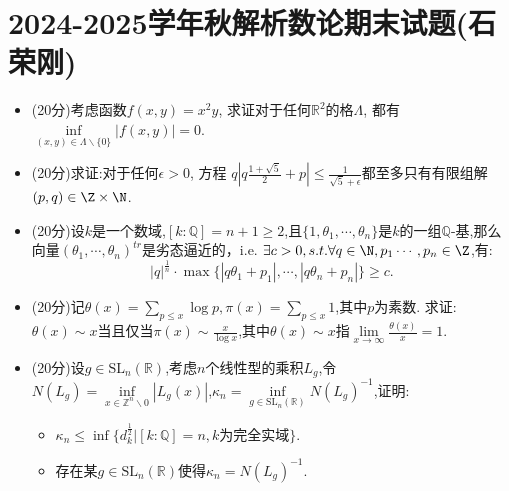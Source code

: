 
\section{2024-2025学年秋解析数论期末试题(石荣刚)}

\begin{itemize}
    \item[1.](20分)考虑函数$f(x,y) = x^2 y$, 求证对于任何$\mathbb{R}^2$的格$\Lambda$, 都有$\inf\limits_{(x,y) \in \Lambda \backslash \{0\}} |f(x,y)| = 0$.

    \item[2.](20分)求证:对于任何$\epsilon > 0$, 方程 $q|q \frac{1+\sqrt 5}{2} + p| \leq \frac{1}{\sqrt{5} + \epsilon}$都至多只有有限组解$(p,q) \in \Z \times \N$.

    \item[3.](20分)设$k$是一个数域,$[k:\mathbb{Q}] = n+1 \geq 2$,且$\{1,\theta_1, \cdots, \theta_n\}$是$k$的一组$\mathbb{Q}$-基,那么向量$(\theta_1, \cdots, \theta_n)^{tr}$是劣态逼近的，i.e. 
    $\exists c  > 0, s.t.  \forall q\in \N, p_1 \cdots, p_n \in \Z$,有:
    \[
    |q|^{\frac{1}{n}} \cdot \max \{ |q\theta_1 + p_1| , \cdots  , |q\theta_n+ p_n|\} \geq c.
    \]

    \item[4.](20分)记$\theta(x) = \sum\limits_{p \leq x} \log p,\pi(x) = \sum\limits_{p \leq x} 1$,其中$p$为素数. 求证: $\theta(x) \sim x $当且仅当$ \pi(x) \sim \frac{x}{\log x}$,其中$\theta(x) \sim x $指$\lim\limits_{x\rightarrow\infty}\frac{\theta(x)}{x}=1$.

    \item[5.](20分)设$g\in\text{SL}_{n}(\mathbb{R})$,考虑$n$个线性型的乘积$L_{g}$,令$N(L_{g})=\inf\limits_{x\in\mathbb{Z}^{n}\backslash 0}|L_{g}(x)|$,$\kappa_{n}=\inf\limits_{g\in\text{SL}_{n}(\mathbb{R})}N(L_{g})^{-1}$,证明:
    \begin{itemize}
        \item[(1)]$\kappa_{n}\leq \inf\{d_{k}^{\frac{1}{2}}\big|[k:\mathbb{Q}]=n,k\text{为完全实域}\}$.

        \item[(2)]存在某$g \in \text{SL}_{n}(\mathbb{R})$使得$\kappa_{n}=N(L_{g})^{-1}$.
    \end{itemize}
    
\end{itemize}